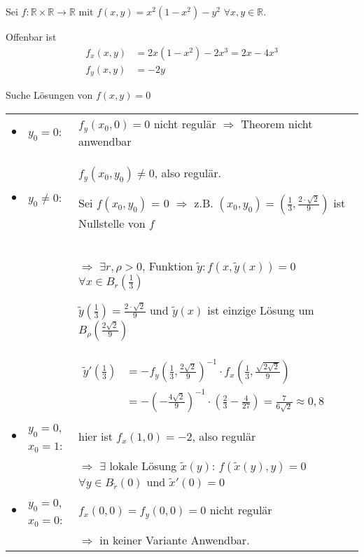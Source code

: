\begin{example}
	Sei $f:\mathbb{R}\times\mathbb{R}\to\mathbb{R}$ mit $f(x,y) = x^2(1 - x^2) - y^2$ $\forall x,y\in\mathbb{R}$.
	
	Offenbar ist \begin{align*}
		f_x(x,y) &= 2x(1 - x^2) - 2x^3 = 2x - 4x^3 \\
		f_y(x,y) &= -2y
	\end{align*}
	
	Suche Lösungen von $f(x,y) = 0$ \\
	\renewcommand{\arraystretch}{1.5}
	\begin{tabularx}{\linewidth}{c@{\ }l@{$\;\,$}X}
		$\bullet$ & $y_0=0$:& $f_y(x_0, 0) = 0$ nicht regulär $\Rightarrow$ Theorem nicht anwendbar \\
		$\bullet$ & $y_0\neq 0$: & $f_y(x_0, y_0)\neq 0$, also regulär.
		
		Sei $f(x_0, y_0)$ = 0 $\Rightarrow$ z.B. $(x_0, y_0) = (\frac{1}{3}, \frac{2\cdot\sqrt{2}}{9})$ ist Nullstelle von $f$  \\
		&&$\Rightarrow$ $\exists r,\rho > 0$, Funktion $\tilde{y}:f(x,\tilde{y}(x)) = 0$ $\forall x\in B_r(\frac{1}{3})$
		
		$\tilde{y}(\frac{1}{3}) = \frac{2\cdot \sqrt{2}}{9}$ und $\tilde{y}(x)$ ist einzige Lösung um $B_\rho(\frac{2\sqrt{2}}{9})$\\
		
		&& $\begin{aligned}\tilde{y}'\left(\frac{1}{3}\right) &= -f_y\left(\frac{1}{3}, \frac{2\sqrt{2}}{9}\right)^{-1}\cdot f_x\left(\frac{1}{3}, \frac{\sqrt{2\sqrt{2}}}{9}\right) \\
		&= -\left(-\frac{4\sqrt{2}}{9}\right)^{-1}\cdot\left(\frac{2}{3} - \frac{4}{27}\right) = \frac{7}{6\sqrt{2}} \approx 0,8\end{aligned}$ \\
		
		$\bullet$ & $y_0 = 0$, $x_0 = 1$: & hier ist $f_x(1,0) = -2$, also regulär \\
		&& $\Rightarrow$ $\exists$ lokale Lösung $\tilde{x}(y)$: $f(\tilde{x}(y), y) = 0$ $\forall y\in B_{\tilde{r}}(0)$ und $\tilde{x}'(0) = 0$ \\
		
		$\bullet$ & $y_0 = 0$, $x_0 = 0$: & $f_x(0,0) = f_y(0,0) = 0$ nicht regulär\\
		&& $\Rightarrow$ in keiner Variante Anwendbar.
	\end{tabularx}
\end{example}


